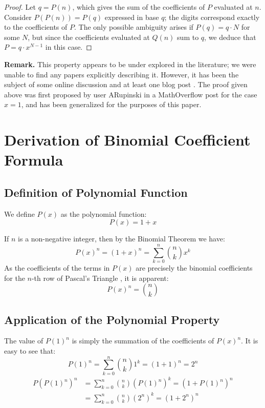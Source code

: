 \documentclass{article}
\theoremstyle{plain}
\theoremstyle{definition}
\begin{document}
\begin{proof}
Let $q = P(n)$, which gives the sum of the coefficients of $P$ evaluated at $n$. Consider $P(P(n)) = P(q)$ expressed in base $q$; the digits correspond exactly to the coefficients of $P$. The only possible ambiguity arises if $P(q) = q\cdot N$ for some $N$, but since the coefficients evaluated at $Q(n)$ sum to $q$, we deduce that $P = q \cdot x^{N-1}$ in this case.
\end{proof}

\textbf{Remark.}
This property appears to be under explored in the literature; we were unable to find any papers explicitly describing it. However, it has been the subject of some online discussion and at least one blog post \cite{jcook}. The proof given above was first proposed by user ARupinski in a MathOverflow post \cite{arupinski} for the case $x=1$, and has been generalized for the purposes of this paper.

\section{Derivation of Binomial Coefficient Formula}
\subsection{Definition of Polynomial Function}
We define $P(x)$ as the polynomial function:
\begin{equation}
    P(x) = 1 + x
\end{equation}

If $n$ is a non-negative integer, then by the Binomial Theorem \cite{stewart2007calculus} we have:
\begin{equation}
    P(x)^{n} = (1 + x)^{n} = \sum_{k=0}^{n} \binom{n}{k} x^{k}
\end{equation}
As the coefficients of the terms in $P(x)$ are precisely the binomial coefficients for the $n$-th row of Pascal's Triangle \cite{rosen2011discrete}, it is apparent:
\begin{equation}
    [x^k] P(x)^{n} = \binom{n}{k}
\end{equation}

\subsection{Application of the Polynomial Property}
The value of $P(1)^{n}$ is simply the summation of the coefficients of $P(x)^{n}$. It is easy to see that:
\begin{equation}
    P(1)^{n} = \sum_{k=0}^{n} \binom{n}{k} 1^{k} = (1 + 1)^{n} = 2^{n}
\end{equation}
\begin{align}
    P(P(1)^{n})^{n} &= \sum_{k=0}^{n} \binom{n}{k} (P(1)^{n})^{k} = (1 + P(1)^{n})^{n} \\
    &= \sum_{k=0}^{n} \binom{n}{k} (2^{n})^{k} = (1 + 2^{n})^{n}
\end{align}
\end{document}
